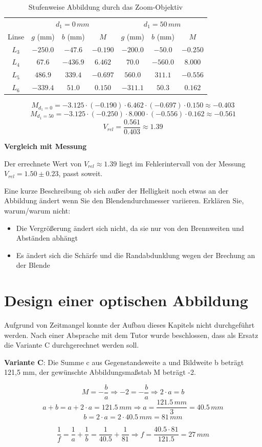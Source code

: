 \documentclass[
  headings=optiontotocandhead,
  twoside,
  openright,
  numbers=noenddot,
  toc=flat,
  11pt,
  parskip=full,
  listof=flat,
  bibliography=totoc,
  a4paper,
  DIV=14,
  BCOR=22mm,
  headheight=5mm,
  headinclude=true,
]{scrartcl}
\begin{document}
\begin{table}[H]
  \centering
  \setlength{\tabcolsep}{6pt}
  \begin{tabular}{ |c|ccc|ccc| }
    & \multicolumn{3}{c|}{$d_1 = 0\,mm$} & \multicolumn{3}{c|}{$d_1 = 50\,mm$} \\
    Linse & $g$ (mm) & $b$ (mm) & $M$ & $g$ (mm) & $b$ (mm) & $M$ \\
    \hline
    $L_3$ & $-250.0$ & $-47.6$ & $-0.190$ & $-200.0$ & $-50.0$ & $-0.250$ \\
    $L_4$ & $67.6$ & $-436.9$ & $6.462$ & $70.0$ & $-560.0$ & $8.000$ \\
    $L_5$ & $486.9$ & $339.4$ & $-0.697$ & $560.0$ & $311.1$ & $-0.556$ \\
    $L_6$ & $-339.4$ & $51.0$ & $0.150$ & $-311.1$ & $50.3$ & $0.162$ \\
  \end{tabular}
  \caption{Stufenweise Abbildung durch das Zoom-Objektiv}
  \label{tab:zoom}
\end{table}
 
$$ M_{d_1=0} = -3.125 \cdot (-0.190) \cdot 6.462 \cdot (-0.697) \cdot 0.150 \approx -0.403 $$
$$ M_{d_1=50} = -3.125 \cdot (-0.250) \cdot 8.000 \cdot (-0.556) \cdot 0.162 \approx -0.561 $$
$$ V_{rel} = \frac{0.561}{0.403} \approx 1.39 $$

\textbf{Vergleich mit Messung}

Der errechnete Wert von $V_{rel} \approx 1.39$ liegt im Fehlerintervall von der Messung $V_{rel} = 1.50 \pm 0.23$, passt soweit.

Eine kurze Beschreibung ob sich außer der Helligkeit noch etwas an der Abbildung ändert wenn Sie den Blendendurchmesser variieren. Erklären Sie, warum/warum nicht:

\begin{itemize}
  \item Die Vergrößerung ändert sich nicht, da sie nur von den Brennweiten und Abständen abhängt
  \item Es ändert sich die Schärfe und die Randabdunklung wegen der Brechung an der Blende
\end{itemize}

\section{Design einer optischen Abbildung}

Aufgrund von Zeitmangel konnte der Aufbau dieses Kapitels nicht durchgeführt werden. Nach einer Absprache mit dem Tutor wurde beschlossen, dass als Ersatz die Variante C durchgerechnet werden soll.

\textbf{Variante C}: Die Summe c aus Gegenstandsweite a und Bildweite b beträgt 121,5 mm, der gewünschte Abbildungsmaßstab M beträgt -2.

$$ M = -\frac{b}{a} \Rightarrow -2 = -\frac{b}{a} \Rightarrow 2 \cdot a = b $$
$$ a + b = a + 2 \cdot a = 121.5 \, mm \Rightarrow a = \frac{121.5 \, mm}{3} = 40.5 \, mm $$
$$ b = 2 \cdot a = 2 \cdot 40.5 \, mm = 81 \, mm $$

$$ \frac{1}{f} = \frac{1}{a} + \frac{1}{b} = \frac{1}{40.5} + \frac{1}{81} \Rightarrow f = \frac{40.5 \cdot 81}{121.5} = 27 \, mm $$
  
\end{document}
